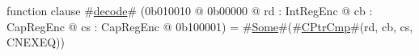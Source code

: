 function clause #\hyperref[zdecode]{decode}# (0b010010 @ 0b00000 @ rd : IntRegEnc @ cb : CapRegEnc @ cs : CapRegEnc @ 0b100001) = #\hyperref[zSome]{Some}#(#\hyperref[zCPtrCmp]{CPtrCmp}#(rd, cb, cs, CNEXEQ))
